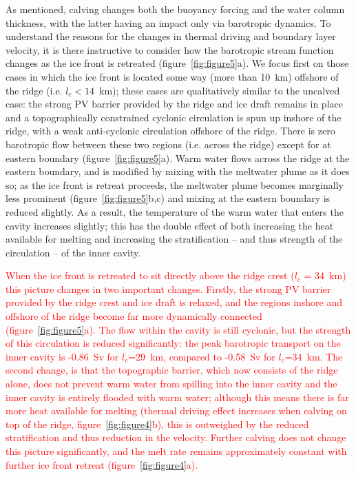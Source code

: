 \documentclass[draft]{agujournal2019}
\begin{document}
As mentioned, calving changes both the buoyancy forcing and the water column thickness, with the latter having an impact only via barotropic dynamics. To understand the reasons for the changes in thermal driving and boundary layer velocity, it is there instructive to consider how the barotropic stream function changes as the ice front is retreated (figure~\ref{fig:figure5}a). We focus first on those cases in which the ice front is located some way (more than 10~km) offshore of the ridge (i.e. $l_c<14$~km); these cases are qualitatively similar to the uncalved case: the strong PV barrier provided by the ridge and ice draft remains in place and a topographically constrained cyclonic circulation is spun up inshore of the ridge, with a weak anti-cyclonic circulation offshore of the ridge. There is zero barotropic flow between these two regions (i.e. across the ridge) except for at eastern boundary (figure~\ref{fig:figure5}a). Warm water flows across the ridge at the eastern boundary, and is modified by mixing with the meltwater plume as it does so; as the ice front is retreat proceeds, the meltwater plume becomes marginally less prominent (figure~\ref{fig:figure5}b,c) and mixing at the eastern boundary is reduced slightly. As a result, the temperature of the warm water that enters the cavity increases slightly; this has the double effect of both increasing the heat available for melting and increasing the stratification -- and thus strength of the circulation -- of the inner cavity.


\textcolor{red}{When the ice front is retreated to sit directly above the ridge crest ($l_c$ = 34~km) this picture changes in two important changes. Firstly, the strong PV barrier provided by the ridge crest and ice draft is relaxed, and the regions inshore and offshore of the ridge become far more dynamically connected (figure~\ref{fig:figure5}a). The flow within the cavity is still cyclonic, but the strength of this circulation is reduced significantly: the peak barotropic transport on the inner cavity is -0.86~Sv for $l_c$=29~km, compared to -0.58~Sv for $l_c$=34~km. The second change, is that the topographic barrier, which now consists of the ridge alone, does not prevent warm water from spilling into the inner cavity and the inner cavity is entirely flooded with warm water; although this means there is far more heat available for melting (thermal driving effect increases when calving on top of the ridge, figure~\ref{fig:figure4}b), this is outweighed by the reduced stratification and thus reduction in the velocity. Further calving does not change this picture significantly, and the melt rate remains approximately constant with further ice front retreat (figure~\ref{fig:figure4}a).}
\end{document}
